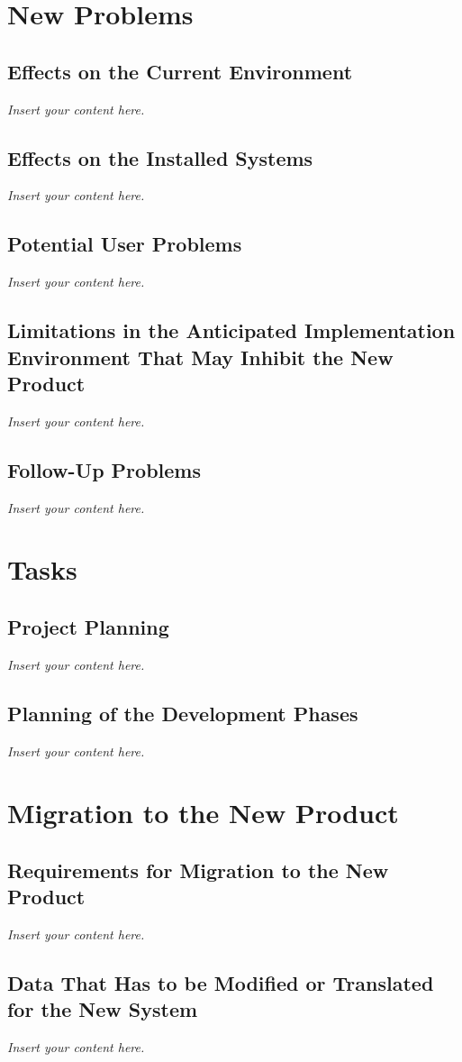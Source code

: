 \documentclass[12pt]{article}
\newcommand{\lips}{\textit{Insert your content here.}}
\begin{document}
\section{New Problems}
\subsection{Effects on the Current Environment}
\lips
\subsection{Effects on the Installed Systems}
\lips
\subsection{Potential User Problems}
\lips
\subsection{Limitations in the Anticipated Implementation Environment That May
Inhibit the New Product}
\lips
\subsection{Follow-Up Problems}
\lips

\section{Tasks}
\subsection{Project Planning}
\lips
\subsection{Planning of the Development Phases}
\lips

\section{Migration to the New Product}
\subsection{Requirements for Migration to the New Product}
\lips
\subsection{Data That Has to be Modified or Translated for the New System}
\lips
\end{document}
